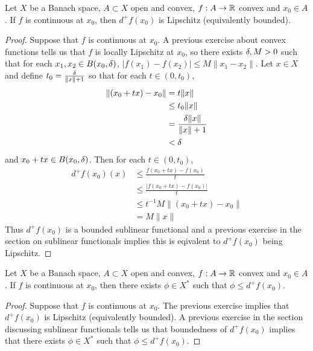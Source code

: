 \documentclass{book}
\begin{document}
	\begin{ex} \lex{}
	Let $X$ be a Banach space, $A \subset X$ open and convex, $f:A \rightarrow \mathbb{R}$ convex and $x_0 \in A$. If $f$ is continuous at $x_0$, then $d^+f(x_0)$ is Lipschitz (equivalently bounded). 
	\end{ex}	
	
	\begin{proof}
	Suppose that $f$ is continuous at $x_0$. A previous exercise about convex functions tells us that $f$ is locally Lipschitz at $x_0$, so there exists $\delta,M >0$ such that for each $x_1, x_2 \in B(x_0, \delta)$, $|f(x_1) - f(x_2)| \leq M\|x_1 - x_2\|$. Let $x \in X$ and define $t_0 = \frac{\delta}{\|x\| + 1}$ so that for each $t \in (0, t_0)$,
	\begin{align*}
	\|(x_0 +tx) - x_0\|
	& = t\|x\| \\
	& \leq t_0 \| x\| \\
	&= \frac{\delta \| x\|}{\|x\| + 1} \\
	& < \delta
	\end{align*}  
	and $x_0 +tx \in B(x_0, \delta)$.
	Then for each $t \in (0, t_0)$, 
	\begin{align*}
	d^+f(x_0)(x) 
	& \leq \frac{f(x_0 + tx) - f(x_0)}{t} \\
	& \leq \frac{|f(x_0 + tx) - f(x_0)|}{t} \\
	& \leq t^{-1}M \| (x_0 + tx) - x_0\| \\
	&= M\|x\|
	\end{align*}
	Thus $d^+f(x_0)$ is a bounded sublinear functional and  a previous exercise in the section on sublinear functionals implies this is eqivalent to $d^+f(x_0)$ being Lipschitz.
	\end{proof}
	
	\begin{ex} \lex{}
	Let $X$ be a Banach space, $A \subset X$ open and convex, $f:A \rightarrow \mathbb{R}$ convex and $x_0 \in A$. If $f$ is continuous at $x_0$, then there exists $\phi \in X^*$ such that $\phi \leq d^+f(x_0)$.
	\end{ex}	
	
	\begin{proof}
	Suppose that $f$ is continuous at $x_0$. The previous exercise implies that $d^+f(x_0)$ is Lipschitz (equivalently bounded). A previous exercise in the section discussing sublinear functionals tells us that boundedness of $d^+f(x_0)$ implies that there exists $\phi \in X^*$ such that $\phi \leq d^+f(x_0)$.
	\end{proof}
	
\end{document}
